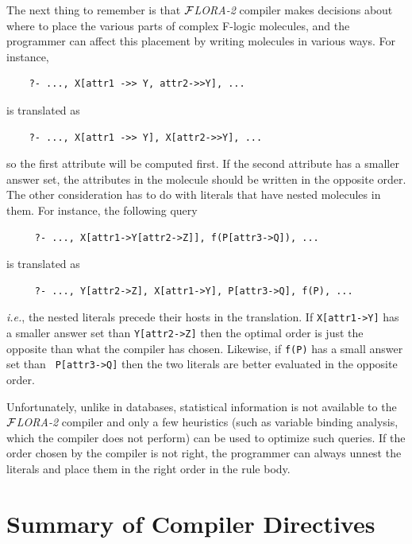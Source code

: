 \documentclass[11pt]{article}
\newcommand{\FLORA}{{\mbox{${\cal F}${\small\it LORA}\rm\emph{-2}}}\xspace}
\begin{document}
The next thing to remember is that \FLORA compiler makes decisions about
where to place the various parts of complex F-logic molecules, and the
programmer can affect this placement by writing molecules in various ways.
For instance,
\begin{verbatim}
    ?- ..., X[attr1 ->> Y, attr2->>Y], ...
\end{verbatim}
is translated as
\begin{verbatim}
    ?- ..., X[attr1 ->> Y], X[attr2->>Y], ...  
\end{verbatim}
so the first attribute will be computed first. If the second attribute has
a smaller answer set, the attributes in the molecule should be written in
the opposite order. The other consideration has to do with literals that
have nested molecules in them. For instance, the following query
\begin{verbatim}
     ?- ..., X[attr1->Y[attr2->Z]], f(P[attr3->Q]), ...
\end{verbatim}
is translated as
\begin{verbatim}
     ?- ..., Y[attr2->Z], X[attr1->Y], P[attr3->Q], f(P), ...
\end{verbatim}
{\it i.e.}, the nested literals precede their hosts in the translation.  If
{\tt X[attr1->Y]} has a smaller answer set than {\tt Y[attr2->Z]} then the
optimal order is just the opposite than what the compiler has
chosen. Likewise, if {\tt f(P)} has a small answer set than {\tt
  P[attr3->Q]} then the two literals are better evaluated in the opposite
order.

Unfortunately, unlike in databases, statistical information is not
available to the \FLORA compiler and only a few heuristics (such as
variable binding analysis, which the compiler does not perform) can be used
to optimize such queries. If the order chosen by the compiler is not right,
the programmer can always unnest the literals and place them in the right
order in the rule body.


\section{Summary of Compiler Directives} \label{sec-comp-directives}
\end{document}
